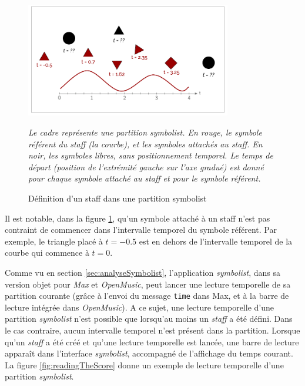 \begin{figure}[H]
	\centering
	\includegraphics[keepaspectratio=true, width=0.8\textwidth]{ModeleDeNotation/i/staffConcept.png}
	\caption{Définition d'un staff dans une partition symbolist}
	\label{fig:exempleDeStaff}
	\small
	\it
	Le cadre représente une partition \emph{symbolist}. En rouge, le symbole référent du \emph{staff} (la courbe), et les symboles attachés au \emph{staff}. En noir, les symboles libres, sans positionnement temporel.
	Le temps de départ (position de l'extrémité gauche sur l'axe gradué) est donné pour chaque symbole attaché au staff et pour le symbole référent.
\end{figure}

Il est notable, dans la figure \ref{fig:exempleDeStaff}, qu'un symbole attaché à un staff n'est pas contraint de commencer dans l'intervalle temporel du symbole référent. Par exemple, le triangle placé à $t = -0.5$ est en dehors de l'intervalle temporel de la courbe qui commence à $t = 0$.

Comme vu en section \ref{sec:analyseSymbolist}, l'application \textit{symbolist}, dans sa version objet pour \textit{Max} et \textit{OpenMusic}, peut lancer une lecture temporelle de sa partition courante (grâce à l'envoi du message \texttt{time} dans Max, et à la barre de lecture intégrée dans \textit{OpenMusic}). A ce sujet, une lecture temporelle d'une partition \textit{symbolist} n'est possible que lorsqu'au moins un \textit{staff} a été défini. Dans le cas contraire, aucun intervalle temporel n'est présent dans la partition. Lorsque qu'un \textit{staff} a été créé et qu'une lecture temporelle est lancée, une barre de lecture apparaît dans l'interface \textit{symbolist}, accompagné de l'affichage du temps courant. La figure \ref{fig:readingTheScore} donne un exemple de lecture temporelle d'une partition \textit{symbolist}.

